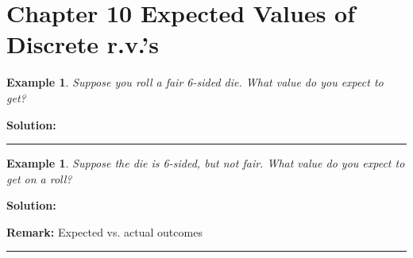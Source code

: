\documentclass[12pt]{amsart}
\newtheorem{example}[theorem]{Example}
\begin{document}
\setcounter{section}{10}
{\huge  
\section*{Chapter 10 \newline Expected Values of Discrete r.v.'s}
}

{\large 

\vspace{1cm}


\begin{example}\label{Die expected outcome}
Suppose you roll a fair 6-sided die. \newline
What value do you expect to get?

\end{example}

\textbf{Solution:}


\vspace{8cm}
\hrule
\vspace{.5cm}

\begin{example}\label{Die expected outcome}
Suppose the die is 6-sided, but not fair. \newline
What value do you expect to get on a roll?

\end{example}

\textbf{Solution:}





\newpage

\textbf{Remark:} Expected vs. actual outcomes%

\vspace{4cm}
\hrule
\vspace{.5cm}

}
\end{document}
